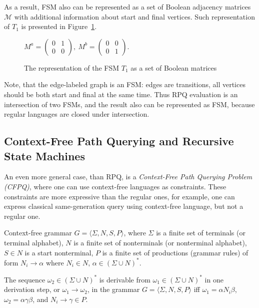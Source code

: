 As a result, FSM also can be represented as a set of Boolean adjacency matrices $\mathcal{M}$ with additional information about start and final vertices. Such representation of $T_1$ is presented in Figure~\ref{fig:boolean_decomposition_of_fsm}.
\begin{figure}[h]
    \centering
$
M^a =
\begin{pmatrix}
0&1 \\
0&0
\end{pmatrix},~
M^b =
\begin{pmatrix}
0&0 \\
0&1
\end{pmatrix}.
$
\caption{The representation of the FSM $T_1$ as a set of Boolean matrices}
\label{fig:boolean_decomposition_of_fsm}
\end{figure}

Note, that the edge-labeled graph is an FSM: edges are transitions, all vertices should be both start and final at the same time.
Thus RPQ evaluation is an intersection of two FSMs, and the result also can be represented as FSM, because regular languages are closed under intersection.

\subsection{Context-Free Path Querying and Recursive State Machines}

An even more general case, than RPQ, is a \textit{Context-Free Path Querying Problem (CFPQ)}, where one can use context-free languages as constraints. These constraints are more expressive than the regular ones, for example, one can express classical same-generation query using context-free language, but not a regular one.

\begin{definition}
Context-free grammar $G = \langle\Sigma, N, S, P\rangle$, where $\Sigma$ is a finite set of terminals (or terminal alphabet), $N$ is a finite set of nonterminals (or nonterminal alphabet), $S \in N$ is a start nonterminal, $P$ is a finite set of productions (grammar rules) of form $N_i \to \alpha$ where  $N_i \in N$, $\alpha \in (\Sigma \cup N)^*$.
\end{definition}

\begin{definition}
The sequence $\omega_2 \in (\Sigma \cup N)^*$ is derivable from $\omega_1 \in (\Sigma \cup N)^*$ in one derivation step, or $\omega_1 \to \omega_2$, in the grammar $G = \langle\Sigma, N, S, P\rangle$ iff $\omega_1=\alpha N_i \beta$, $\omega_2 = \alpha \gamma \beta$, and $N_i \to \gamma \in P$.
\end{definition}

